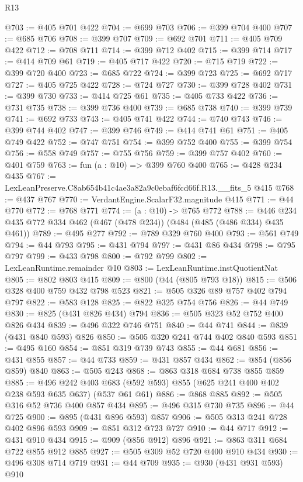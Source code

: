 \begin{lexlean}{R13}
\begin{coremodule}
@703 := @405 @701 @422
@704 := @699 @703
@706 := @399 @704 @400
@707 := @685 @706
@708 := @399 @707
@709 := @692 @701
@711 := @405 @709 @422
@712 := @708 @711
@714 := @399 @712 @402
@715 := @399 @714
@717 := @414 @709 @61
@719 := @405 @717 @422
@720 := @715 @719
@722 := @399 @720 @400
@723 := @685 @722
@724 := @399 @723
@725 := @692 @717
@727 := @405 @725 @422
@728 := @724 @727
@730 := @399 @728 @402
@731 := @399 @730
@733 := @414 @725 @61
@735 := @405 @733 @422
@736 := @731 @735
@738 := @399 @736 @400
@739 := @685 @738
@740 := @399 @739
@741 := @692 @733
@743 := @405 @741 @422
@744 := @740 @743
@746 := @399 @744 @402
@747 := @399 @746
@749 := @414 @741 @61
@751 := @405 @749 @422
@752 := @747 @751
@754 := @399 @752 @400
@755 := @399 @754
@756 := @558 @749
@757 := @755 @756
@759 := @399 @757 @402
@760 := @401 @759
@763 := fun (a : @10) => @399 @760 @400
@765 := @428 @234 @435
@767 := LexLeanPreserve.C8ab654b41c4ae3a82a9c0ebaf6fcd66f.R13.__fits_5 @415
@768 := @437 @767
@770 := VerdantEngine.ScalarF32.magnitude @415
@771 := @44 @770
@772 := @768 @771
@774 := (a : @10) -> @765 @772
@788 := @446 @234 @435 @772 @334 @462 (@467 (@478 @234)) (@484 (@485 (@486 @334) @435 @461))
@789 := @495 @277
@792 := @789 @329 @760 @400
@793 := @561 @749
@794 := @44 @793
@795 := @431 @794
@797 := @431 @86 @434
@798 := @795 @797
@799 := @433 @798
@800 := @792 @799
@802 := LexLeanRuntime.remainder @10
@803 := LexLeanRuntime.instQuotientNat
@805 := @802 @803 @415
@809 := @800 (@44 (@805 @793 @18))
@815 := @506 @328 @400 @759 @432 @798 @523
@821 := @505 @326 @89 @757 @402 @794 @797
@822 := @583 @128
@825 := @822 @325 @754 @756
@826 := @44 @749
@830 := @825 (@431 @826 @434) @794
@836 := @505 @323 @52 @752 @400 @826 @434
@839 := @496 @322 @746 @751
@840 := @44 @741
@844 := @839 (@431 @840 @593) @826
@850 := @505 @320 @241 @744 @402 @840 @593
@851 := @495 @160
@854 := @851 @319 @739 @743
@855 := @44 @681
@856 := @431 @855
@857 := @44 @733
@859 := @431 @857 @434
@862 := @854 (@856 @859) @840
@863 := @505 @243
@868 := @863 @318 @684 @738 @855 @859
@885 := @496
    @242
    @403
    @683
    (@592 @593)
    @855
    (@625 @241 @400 @402 @238 @593 @635 @637)
    (@537 @61 @61)
@886 := @868 @885
@892 := @505 @316 @52 @736 @400 @857 @434
@895 := @496 @315 @730 @735
@896 := @44 @725
@900 := @895 (@431 @896 @593) @857
@906 := @505 @313 @241 @728 @402 @896 @593
@909 := @851 @312 @723 @727
@910 := @44 @717
@912 := @431 @910 @434
@915 := @909 (@856 @912) @896
@921 := @863 @311 @684 @722 @855 @912 @885
@927 := @505 @309 @52 @720 @400 @910 @434
@930 := @496 @308 @714 @719
@931 := @44 @709
@935 := @930 (@431 @931 @593) @910

\end{coremodule}
\end{lexlean}

